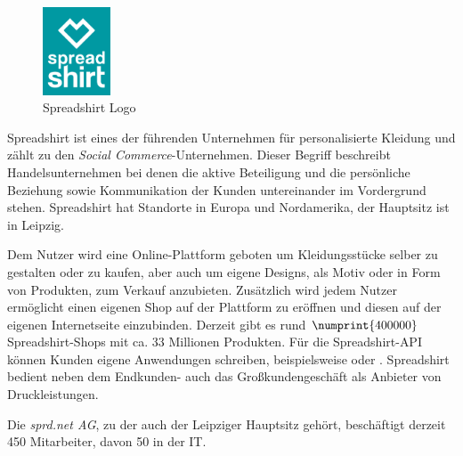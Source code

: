 
\begin{figure}[!htb]
	\centering
		\includegraphics[width=2cm]{resources/sprd_logo_cmyk}
	\caption{Spreadshirt Logo}
	\label{fig:spreadshirtLogo}
\end{figure}

Spreadshirt ist eines der führenden Unternehmen für personalisierte Kleidung und zählt zu den \emph{Social Commerce}-Unternehmen. Dieser Begriff beschreibt Handelsunternehmen bei denen die aktive Beteiligung und die persönliche Beziehung sowie Kommunikation der Kunden untereinander im Vordergrund stehen. 
Spreadshirt hat Standorte in Europa und Nordamerika, der Hauptsitz ist in Leipzig. 

Dem Nutzer wird eine Online-Plattform geboten um Kleidungsstücke selber zu gestalten oder zu kaufen, aber auch um eigene Designs, als Motiv oder in Form von Produkten, zum Verkauf anzubieten. 
Zusätzlich wird jedem Nutzer ermöglicht einen eigenen Shop auf der Plattform zu eröffnen und diesen auf der eigenen Internetseite einzubinden. Derzeit gibt es rund $\numprint{400000}$ 
Spreadshirt-Shops mit ca. 33 Millionen %
Produkten.
Für die Spreadshirt-\gls{API} können Kunden eigene Anwendungen schreiben, beispielsweise  \cite{zufallsshirt} oder  \cite{soundslikecotton}.
Spreadshirt bedient neben dem Endkunden- auch das Großkundengeschäft als Anbieter von Druckleistungen.

Die \emph{sprd.net AG}, zu der auch der Leipziger Hauptsitz gehört, beschäftigt derzeit 450 Mitarbeiter, davon 50 in der IT. %
